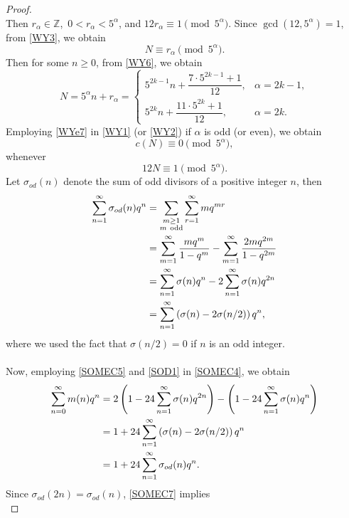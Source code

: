 \documentclass[12pt]{article}
\numberwithin{equation}{section}
\theoremstyle{definition}
\theoremstyle{remark}
\numberwithin{equation}{section}
\begin{document}
\begin{proof}
\begin{equation}
\end{equation}
Then $r_\alpha\in\mathbb Z$, \,$0<r_\alpha<5^\alpha$, and
$12r_\alpha\equiv1\pmod{5^\alpha}$. Since
$\gcd(12,5^\alpha)=1$, from \eqref{WY3}, we obtain
\begin{equation}\label{WY6}
N\equiv r_\alpha\pmod{5^\alpha}.    
\end{equation}
Then for some $n\geq0$, from  \eqref{WY6}, we obtain
\begin{equation}\label{WYe7}
N=5^\alpha n+r_\alpha=
\begin{cases}
5^{2k-1}n+\dfrac{7\cdot5^{2k-1}+1}{12},
& \alpha=2k-1,\\[8pt]
5^{2k}n+\dfrac{11\cdot5^{2k}+1}{12},
& \alpha=2k.
\end{cases}    
\end{equation}
Employing \eqref{WYe7} in \eqref{WY1} (or \eqref{WY2}) if  $\alpha$ is odd (or even), we obtain
\begin{equation}\label{WY7}
c(N)\equiv0\pmod{5^\alpha},
\end{equation}
whenever $$12N\equiv1\pmod{5^\alpha}.$$ 
Let  $\sigma_{od}(n)$ denote the sum of odd divisors of a positive integer $n$, then
\begin{align}
\sum_{n=1}^{\infty}\sigma_{od}(n)q^n
&=\sum_{\substack{m\geq1\\ m\ {\rm odd}}}
\sum_{r=1}^{\infty}mq^{mr} \notag\\
&=\sum_{m=1}^{\infty}\dfrac{mq^m}{1-q^m}
-\sum_{m=1}^{\infty}\dfrac{2mq^{2m}}{1-q^{2m}} \notag\\
&=\sum_{n=1}^{\infty}\sigma(n)q^n
-2\sum_{n=1}^{\infty}\sigma(n)q^{2n} \notag\\
&\label{SOD1}=\sum_{n=1}^{\infty}
\left(\sigma(n)-2\sigma(n/2)\right)q^n, 
\end{align}
where we used the fact that $\sigma(n/2)=0$ if $n$ is an odd  integer.\\\\
Now, employing \eqref{SOMEC5} and \eqref{SOD1} in \eqref{SOMEC4}, we obtain
\begin{align}
\sum_{n=0}^{\infty}m(n)q^n
&=2\left(1-24\sum_{n=1}^{\infty}\sigma(n)q^{2n}\right)-\left(1-24\sum_{n=1}^{\infty}\sigma(n)q^{n}\right) \notag\\
&=1+24\sum_{n=1}^{\infty}
\left(\sigma(n)-2\sigma(n/2)\right)q^n \notag\\
&\label{SOMEC7}=1+24\sum_{n=1}^{\infty}\sigma_{od}(n)q^n.
\end{align}
Since  $\sigma_{od}(2n)=\sigma_{od}(n)$, \eqref{SOMEC7} implies
\begin{equation}\label{SOMEC9}

\end{equation}
\end{proof}
\end{document}
